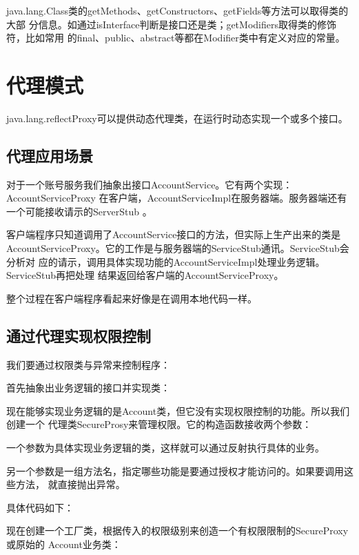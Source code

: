 java.lang.Class类的getMethods、getConstructors、getFields等方法可以取得类的大部
分信息。如通过isInterface判断是接口还是类；getModifiers取得类的修饰符，比如常用
的final、public、abstract等都在Modifier类中有定义对应的常量。





\section{代理模式}

java.lang.reflectProxy可以提供动态代理类，在运行时动态实现一个或多个接口。



\subsection{代理应用场景}

对于一个账号服务我们抽象出接口AccountService。它有两个实现：AccountServiceProxy
在客户端，AccountServiceImpl在服务器端。服务器端还有一个可能接收请示的ServerStub
。

客户端程序只知道调用了AccountService接口的方法，但实际上生产出来的类是
AccountServiceProxy。它的工作是与服务器端的ServiceStub通讯。ServiceStub会分析对
应的请示，调用具体实现功能的AccountServiceImpl处理业务逻辑。ServiceStub再把处理
结果返回给客户端的AccountServiceProxy。

整个过程在客户端程序看起来好像是在调用本地代码一样。



\subsection{通过代理实现权限控制}

我们要通过权限类与异常来控制程序：





首先抽象出业务逻辑的接口并实现类：





现在能够实现业务逻辑的是Account类，但它没有实现权限控制的功能。所以我们创建一个
代理类SecureProsy来管理权限。它的构造函数接收两个参数：

一个参数为具体实现业务逻辑的类，这样就可以通过反射执行具体的业务。

另一个参数是一组方法名，指定哪些功能是要通过授权才能访问的。如果要调用这些方法，
就直接抛出异常。

具体代码如下：



现在创建一个工厂类，根据传入的权限级别来创造一个有权限限制的SecureProxy或原始的
Account业务类：


